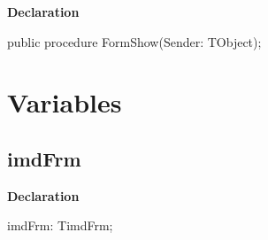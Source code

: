 \documentclass{report}
\newif\ifpdf
\begin{document}
\label{xtypefm.TimdFrm-FormShow}
\begin{list}{}{
\setlength{\itemindent}{0cm}
\setlength{\listparindent}{0cm}
\setlength{\leftmargin}{\evensidemargin}
\addtolength{\leftmargin}{\tmplength}
\settowidth{\labelsep}{X}
\addtolength{\leftmargin}{\labelsep}
\setlength{\labelwidth}{\tmplength}
}
\item[\textbf{Declaration}\hfill]
\ifpdf
\begin{flushleft}
\fi
\begin{ttfamily}
public procedure FormShow(Sender: TObject);\end{ttfamily}

\ifpdf
\end{flushleft}
\fi

\end{list}
\section{Variables}
\ifpdf
\subsection*{\large{\textbf{imdFrm}}\normalsize\hspace{1ex}\hrulefill}
\else
\subsection*{imdFrm}
\fi
\label{xtypefm-imdFrm}
\begin{list}{}{
\setlength{\itemindent}{0cm}
\setlength{\listparindent}{0cm}
\setlength{\leftmargin}{\evensidemargin}
\addtolength{\leftmargin}{\tmplength}
\settowidth{\labelsep}{X}
\addtolength{\leftmargin}{\labelsep}
\setlength{\labelwidth}{\tmplength}
}
\item[\textbf{Declaration}\hfill]
\ifpdf
\begin{flushleft}
\fi
\begin{ttfamily}
imdFrm: TimdFrm;\end{ttfamily}

\ifpdf
\end{flushleft}
\fi

\end{list}
\end{document}
